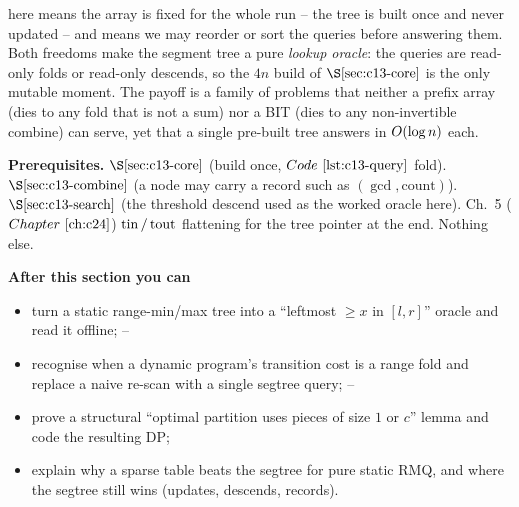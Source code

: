 \begin{topicintro}
 here means the array is fixed for the whole run -- the tree is
built once and never updated -- and  means we may reorder or sort
the queries before answering them.  Both freedoms make the segment tree a pure
\emph{lookup oracle}: the queries are read-only folds or read-only descends, so
the \(4n\) build of \(\secref{c13-core}\) is the only mutable moment.  The payoff
is a family of problems that neither a prefix array (dies to any fold that is
not a sum) nor a BIT (dies to any non-invertible combine) can serve, yet that a
single pre-built tree answers in \(O(\log n)\) each.

\textbf{Prerequisites.} \(\secref{c13-core}\) (build once, \(\coderef{c13-query}\)
fold).  \(\secref{c13-combine}\) (a node may carry a record such as
\((\gcd,\text{count})\)).  \(\secref{c13-search}\) (the threshold descend used as
the worked oracle here).  Ch.~5 (\(\chref{c24}\)) \(\operatorname{tin}/\operatorname{tout}\) flattening for
the tree pointer at the end.  Nothing else.

\textbf{After this section you can}
\begin{itemize}[nosep]
  \item turn a static range-min/max tree into a ``leftmost \(\ge x\) in
        \([l,r]\)'' oracle and read it offline; \hfill{}--
  \item recognise when a dynamic program's transition cost is a range fold and
        replace a naive re-scan with a single segtree query; \hfill{}--
  \item prove a structural ``optimal partition uses pieces of size \(1\) or \(c\)''
        lemma and code the resulting DP; \hfill{}
  \item explain why a sparse table beats the segtree for pure static RMQ, and
        where the segtree still wins (updates, descends, records). \hfill{}
\end{itemize}
\end{topicintro}

